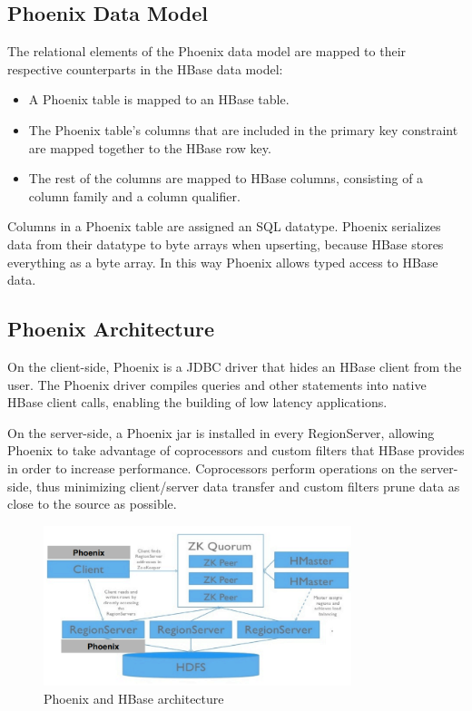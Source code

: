 \subsection{Phoenix Data Model}

The relational elements of the Phoenix data model are mapped to their respective counterparts in the HBase data model:

\begin{itemize}
\item A Phoenix table is mapped to an HBase table.
\item The Phoenix table's columns that are included in the primary key constraint are mapped together to the HBase row key.
\item The rest of the columns are mapped to HBase columns, consisting of a column family and a column qualifier.
\end{itemize}

Columns in a Phoenix table are assigned an SQL datatype. Phoenix serializes data from their datatype to byte arrays when upserting, because HBase stores everything as a byte array. In this way Phoenix allows typed access to HBase data.

\subsection{Phoenix Architecture}

On the client-side, Phoenix is a JDBC driver that hides an HBase client from the user. The Phoenix driver compiles queries and other statements into native HBase client calls, enabling the building of low latency applications.

On the server-side, a Phoenix jar is installed in every RegionServer, allowing Phoenix to take advantage of coprocessors and custom filters that HBase provides in order to increase performance. Coprocessors perform operations on the server-side, thus minimizing client/server data transfer and custom filters prune data as close to the source as possible.

\begin{figure}[H]
\centering
\includegraphics[width=0.8\textwidth]{figures/phoenix_architecture}
\caption{Phoenix and HBase architecture}
\label{figure:phoenix_architecture}
\end{figure}

